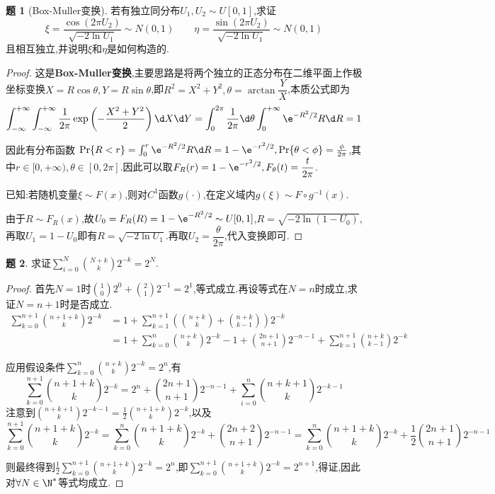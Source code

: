 \documentclass{article}
\theoremstyle{definition}
\newtheorem{exercise}{题}[section]
\begin{document}
\begin{exercise}[Box-Muller变换]
    若有独立同分布$U_1,U_2\sim U[0,1]$,求证$$\xi=\frac{\cos(2\pi U_2)}{\sqrt{-2\ln U_1}}\sim N(0,1)\qquad \eta=\frac{\sin(2\pi U_2)}{\sqrt{-2\ln U_1}}\sim N(0,1)$$且相互独立,并说明$\xi$和$\eta$是如何构造的.
\end{exercise}
\begin{proof}
    这是\textbf{Box-Muller变换},主要思路是将两个独立的正态分布在二维平面上作极坐标变换$X=R\cos\theta, Y=R\sin\theta$,即$R^2=X^2+Y^2, \theta=\arctan\dfrac{Y}{X}$,本质公式即为
    $$\int_{-\infty}^{+\infty}\int_{-\infty}^{+\infty}\frac{1}{2\pi}\exp\left(-\frac{X^2+Y^2}{2}\right)\d X\d Y=\int_{0}^{2\pi}\frac{1}{2\pi}\d\theta \int_{0}^{+\infty}\e^{-R^2/2}R\d R=1$$

    因此有分布函数 $\Pr\{R<r\}=\int_0^r \e^{-R^2/2}R\d R=1-\e^{-r^2/2}, \Pr\{\theta<\phi\}=\frac{\phi}{2\pi}$,其中$r\in[0,+\infty),\theta\in[0,2\pi]$.因此可以取$F_R(r)=1-\e^{-r^2/2},F_\theta(t)=\dfrac{t}{2\pi}$.

    已知:若随机变量$\xi\sim F(x)$,则对$C^1$函数$g(\cdot) $,在定义域内$g(\xi)\sim F\circ g^{-1}(x)$.

    由于$R\sim F_R(x)$,故$U_0=F_R(R)=1-\e^{-R^2/2}\sim U[0,1]$,$R=\sqrt{-2\ln(1-U_0)}$,再取$U_1=1-U_0$即有$R=\sqrt{-2\ln U_1}$.再取$U_2=\dfrac{\theta}{2\pi}$,代入变换即可.
\end{proof}

\begin{exercise}
    求证$\sum_{i=0}^N \binom{N+k}{k}2^{-k}=2^N$.
\end{exercise}
\begin{proof}
    首先$N=1$时$\binom{1}{0}2^{0}+\binom{2}{1}2^{-1}=2^1$,等式成立.再设等式在$N=n$时成立,求证$N=n+1$时是否成立.
    $$\begin{aligned}
       \sum_{k=0}^{n+1} \binom{n+1+k}{k} 2^{-k}&=1+\sum_{k=1}^{n+1} \left(\binom{n+k}{k}+\binom{n+k}{k-1}\right)2^{-k}\\
       &=1+\sum_{k=0}^n\binom{n+k}{k} 2^{-k}-1+\binom{2n+1}{n+1}2^{-n-1}+\sum_{k=1}^{n+1}\binom{n+k}{k-1} 2^{-k}
    \end{aligned}$$

    应用假设条件$\sum_{k=0}^n\binom{n+k}{k} 2^{-k}=2^n$,有
    $$\sum_{k=0}^{n+1} \binom{n+1+k}{k} 2^{-k}=2^n+\binom{2n+1}{n+1}2^{-n-1}+\sum_{i=0}^{n}\binom{n+k+1}{k}2^{-k-1}$$
    注意到$\binom{n+k+1}{k}2^{-k-1}=\frac{1}{2}\binom{n+1+k}{k}2^{-k}$,以及
    $$\sum_{k=0}^{n+1}\binom{n+1+k}{k}2^{-k}=\sum_{k=0}^{n}\binom{n+1+k}{k}2^{-k}+\binom{2n+2}{n+1}2^{-n-1}=\sum_{k=0}^{n}\binom{n+1+k}{k}2^{-k}+\frac{1}{2}\binom{2n+1}{n+1}2^{-n-1}$$

    则最终得到$\frac{1}{2}\sum_{k=0}^{n+1}\binom{n+1+k}{k}2^{-k}=2^{n}$,即$\sum_{k=0}^{n+1}\binom{n+1+k}{k}2^{-k}=2^{n+1}$,得证,因此对$\forall N\in \N^*$等式均成立.
\end{proof}
\end{document}
